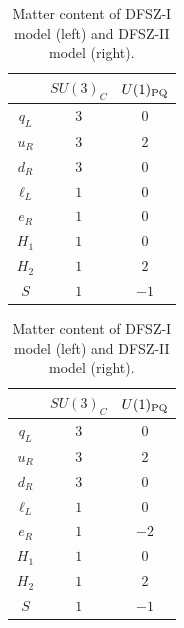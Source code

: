 \documentclass[11pt,a4paper]{article}
\begin{document}
\begin{table}[h]
\centering
\begin{tabular}{c|cc}
& $SU(3)_C$ & $U(1)_{\rm PQ}$ \\\hline
$q_L$ & $3$ & $0$ \\
$u_R$ & $3$ & $2$ \\
$d_R$ & $3$ & $0$ \\
$\ell_L$ & $1$ & $0$ \\
$e_R$ & $1$ & $0$ \\
$H_1$ & $1$ & $0$ \\
$H_2$ & $1$ & $2$ \\
$S$ & $1$ & $-1$
\end{tabular}
\qquad\qquad
\begin{tabular}{c|cc}
& $SU(3)_C$ & $U(1)_{\rm PQ}$ \\\hline
$q_L$ & $3$ & $0$ \\
$u_R$ & $3$ & $2$ \\
$d_R$ & $3$ & $0$ \\
$\ell_L$ & $1$ & $0$ \\
$e_R$ & $1$ & $-2$ \\
$H_1$ & $1$ & $0$ \\
$H_2$ & $1$ & $2$ \\
$S$ & $1$ & $-1$
\end{tabular}
\caption{Matter content of DFSZ-I model (left) and DFSZ-II model (right).}\label{tab:DFSZ}
\end{table}
\end{document}
